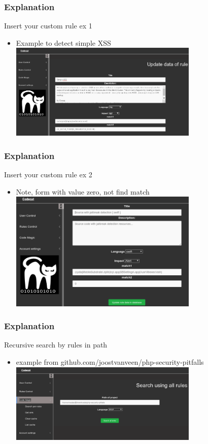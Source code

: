 \documentclass[serif,mathserif]{beamer}
\begin{document}
\begin{frame}
  \frametitle{Explanation}
  Insert your custom rule ex 1
  \begin{itemize}
  \item Example to detect simple XSS 	  
  \includegraphics[width=9cm]{images/insertrule2.png} 
  \end{itemize}
\end{frame}

\begin{frame}
  \frametitle{Explanation}
  Insert your custom rule ex 2
  \begin{itemize}
  \item Note, form with value zero, not find match	  
  \includegraphics[width=9cm]{images/insertrule.png} 
  \end{itemize}
\end{frame}


\begin{frame}
  \frametitle{Explanation}
  Recursive search by rules in path
  \begin{itemize}	
  \item example from github.com/joostvanveen/php-security-pitfalls
  \includegraphics[width=9cm]{images/allsinks.png} 
  \end{itemize}
\end{frame}
\end{document}
